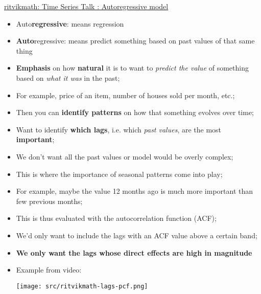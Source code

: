 \documentclass[12pt, titlepage, french]{report}
\begin{document}
\begin{YTB_SUMM}{\href{https://www.youtube.com/watch?v=5-2C4eO4cPQ&list=PLvcbYUQ5t0UHOLnBzl46_Q6QKtFgfMGc3&index=5}{ritvikmath: Time Series Talk : Autoregressive model}}
\begin{itemize}
	\item	Auto\textbf{regressive}: means regression
	\item	\textbf{Auto}regressive: means predict something based on past values of that same thing
	\item	\textbf{Emphasis} on how \textbf{natural} it is to want to \textit{predict the value} of something based on \textit{what it was} in the past;
	\item[]	For example, price of an item, number of houses sold per month, etc.;
	\item[]	Then you can \textbf{identify patterns} on how that something evolves over time;
	\item	Want to identify \textbf{which lags}, i.e. which \textit{past values}, are the most \textbf{important};
	\item[]	We don't want all the past values or model would be overly complex;
	\item	This is where the importance of seasonal patterns come into play;
	\item[]	For example, maybe the value 12 months ago is much more important than few previous months;
	\item	This is thus evaluated with the autocorrelation function (ACF);
	\item[]	We'd only want to include the lags with an ACF value above a certain band;
	\item	\textbf{We only want the lags whose direct effects are high in magnitude}	
	\item	Example from video:
	
	\texttt{[image: src/ritvikmath-lags-pcf.png]}
\end{itemize}
\end{YTB_SUMM}
\end{document}
